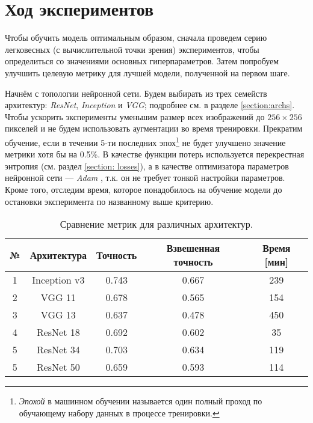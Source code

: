 \section{Ход экспериментов}

\indent
\indent
Чтобы обучить модель оптимальным образом, сначала проведем серию
легковесных (с вычислительной точки зрения) экспериментов, чтобы определиться 
со значениями основных гиперпараметров. Затем попробуем улучшить целевую метрику
для лучшей модели, полученной на первом шаге.

\indent
\indent
Начнём с топологии нейронной сети. Будем выбирать из трех семейств архитектур:
 \textit{ResNet}, \textit{Inception} и \textit{VGG}; подробнее см. в разделе \ref{section:archs}.
Чтобы ускорить эксперименты уменьшим размер всех изображений до
$256 \times 256$ пикселей и не будем использовать аугментации во время тренировки.
Прекратим обучение, если в течении 5-ти последних 
эпох\footnote{\textit{Эпохой} в машинном обучении называется один полный проход по
обучающему набору данных в процессе тренировки.} 
не будет улучшено 
значение метрики хотя бы на 0.5\%. В качестве функции потерь используется перекрестная
энтропия (см. раздел \ref{section: losses}), а в качестве оптимизатора параметров 
нейронной сети --- \textit{Adam} \cite{adam}, т.к. он не требует тонкой настройки
параметров. Кроме того, отследим время, которое 
понадобилось на обучение модели до остановки эксперимента 
по названному выше критерию.


\begin{table}[h]
    \begin{center}
        \begin{tabular}{c | c| c | c | c}
            \hline
            № & Архитектура & Точность & Взвешенная точность  & Время [мин] \\
            \hline
    
            1 & Inception v3 & 0.743 & 0.667 & 239 \\
            
            2 & VGG 11 & 0.678 & 0.565 & 154 \\
            
            3 & VGG 13 & 0.637 & 0.478 & 450 \\
            
            4 & ResNet 18 & 0.692 & 0.602 & 35 \\
            
            5 & ResNet 34 & 0.703 & 0.634 & 119 \\
            
            5 & ResNet 50 & 0.659 & 0.593 & 114 \\
    
            \hline
        \end{tabular}
    \end{center}
    \caption{Сравнение метрик для различных архитектур.}
    \label{tabular: arch_compare}
\end{table}


